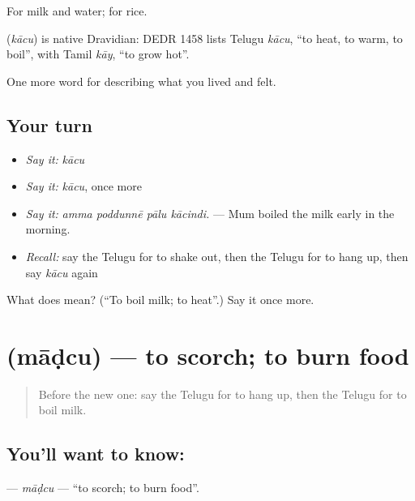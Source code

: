 For milk and water;   for rice.

\begin{cousinweb}
\textbf{} (\emph{kācu}) is native Dravidian: DEDR 1458 lists Telugu \emph{kācu}, \textquotedblleft{}to heat, to warm, to boil\textquotedblright{}, with Tamil \emph{kāy}, \textquotedblleft{}to grow hot\textquotedblright{}.
\end{cousinweb}

\begin{grammarlens}[title={What you've built}]
One more word for describing what you lived and felt.
\end{grammarlens}

\subsection*{Your turn}
\begin{itemize}
\raggedright
  \item \emph{Say it:} \emph{kācu}
  \item \emph{Say it:} \emph{kācu}, once more
  \item \emph{Say it:} \emph{amma poddunnē pālu kācindi.} — Mum boiled the milk early in the morning.
  \item \emph{Recall:} say the Telugu for to shake out, then the Telugu for to hang up, then say \emph{kācu} again
\end{itemize}

\begin{tcolorbox}[breakable,colback=teal!4,colframe=teal!35!black,title={Before you move on}]
What does  mean? (\textquotedblleft{}To boil milk; to heat\textquotedblright{}.) Say it once more.
\end{tcolorbox}
\section[\texorpdfstring{\te{మాడ్చు} (māḍcu)}{మాడ్చు (māḍcu)}]{ (māḍcu) — to scorch; to burn food}

\label{lesson:TE-C548-madcu}



\begin{quote}
Before the new one: say the Telugu for to hang up, then the Telugu for to boil milk.
\end{quote}

\subsection*{You'll want to know: }
\textbf{} — \emph{māḍcu} — \textquotedblleft{}to scorch; to burn food\textquotedblright{}.

